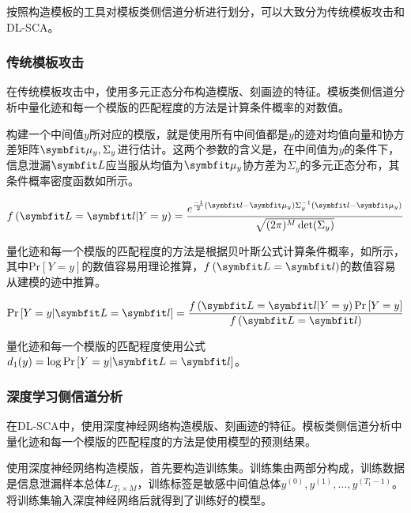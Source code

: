 {	按照构造模板的工具对模板类侧信道分析进行划分，可以大致分为传统模板攻击和DL-SCA。
	\subsubsection{传统模板攻击}
	
	在传统模板攻击中，使用多元正态分布构造模版、刻画迹的特征。模板类侧信道分析中量化迹和每一个模版的匹配程度的方法是计算条件概率的对数值。
	
	构建一个中间值$y$所对应的模版，就是使用所有中间值都是$y$的迹对均值向量和协方差矩阵$\Vector {\mu_y},\Sigma_y$进行估计。这两个参数的含义是，在中间值为$y$的条件下，信息泄漏$\Vector L$应当服从均值为$\Vector {\mu_y}$协方差为$\Sigma_y$的多元正态分布，其条件概率密度函数如所示。
	
	\begin{equation}\label{eq:f(b|a)}
		f\left(\Vector L=\Vector l|Y=y \right)=\frac{e^{\frac{-1}2(\Vector l-\Vector {\mu_y})\Sigma_y^{-1}(\Vector l-\Vector {\mu_y})}}{\sqrt{(2\pi)^M\det (\Sigma_y)}}
	\end{equation}
	
	
	量化迹和每一个模版的匹配程度的方法是根据贝叶斯公式计算条件概率，如所示，其中$\mathrm{Pr}\left[Y=y \right]$的数值容易用理论推算，$f\left(\Vector L=\Vector l\right)$的数值容易从建模的迹中推算。
	
	\begin{equation}\label{eq:pr(a|b)}
		\mathrm{Pr}\left[Y=y|\Vector L=\Vector l \right]=\frac{f\left(\Vector L=\Vector l|Y=y \right)\mathrm{Pr}\left[Y=y \right]}{f\left(\Vector L=\Vector l\right)}
	\end{equation}
	
	量化迹和每一个模版的匹配程度使用公式$d_1(y)=\log \mathrm{Pr}\left[Y=y|\Vector L=\Vector l \right]$。
	\subsubsection{深度学习侧信道分析}
	在DL-SCA中，使用深度神经网络构造模版、刻画迹的特征。模板类侧信道分析中量化迹和每一个模版的匹配程度的方法是使用模型的预测结果。
	
	使用深度神经网络构造模版，首先要构造训练集。训练集由两部分构成，训练数据是信息泄漏样本总体$L_{T_t\times M}$，训练标签是敏感中间值总体$y^{(0)},y^{(1)},\dots,y^{(T_t-1)}$。将训练集输入深度神经网络后就得到了训练好的模型。
	
}
